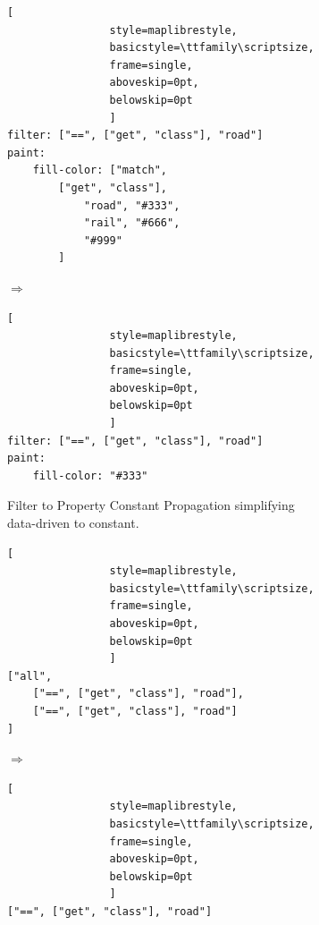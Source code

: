 \begin{figure}[ht]
\begin{subfigure}[t]{\linewidth}
		\begin{minipage}[c]{0.42\linewidth}
			\centering
			\begin{lstlisting}[
				style=maplibrestyle,
				basicstyle=\ttfamily\scriptsize,
				frame=single,
				aboveskip=0pt,
				belowskip=0pt
				]
filter: ["==", ["get", "class"], "road"]
paint:
	fill-color: ["match",
		["get", "class"],
			"road", "#333",
			"rail", "#666",
			"#999"
		]
			\end{lstlisting}
		\end{minipage}
		\hfill
		\begin{minipage}[c]{0.08\linewidth}
			\centering
			\vfill
			{\Huge$\Longrightarrow$}
			\vfill
		\end{minipage}
		\hfill
		\begin{minipage}[c]{0.42\linewidth}
			\centering
			\begin{lstlisting}[
				style=maplibrestyle,
				basicstyle=\ttfamily\scriptsize,
				frame=single,
				aboveskip=0pt,
				belowskip=0pt
				]
filter: ["==", ["get", "class"], "road"]
paint:
	fill-color: "#333"
			\end{lstlisting}
		\end{minipage}

		\caption{
Filter to Property Constant Propagation simplifying data-driven to constant.}
		\label{fig:expr_b}
	\end{subfigure}

	\vspace{4mm}

	\begin{subfigure}[t]{\linewidth}
		\centering

		\begin{minipage}[c]{0.42\linewidth}
			\centering
			\begin{lstlisting}[
				style=maplibrestyle,
				basicstyle=\ttfamily\scriptsize,
				frame=single,
				aboveskip=0pt,
				belowskip=0pt
				]
["all",
	["==", ["get", "class"], "road"],
	["==", ["get", "class"], "road"]
]
			\end{lstlisting}
		\end{minipage}
		\hfill
		\begin{minipage}[c]{0.08\linewidth}
			\centering
			\vfill
			{\Huge$\Longrightarrow$}
			\vfill
		\end{minipage}
		\hfill
		\begin{minipage}[c]{0.42\linewidth}
			\centering
			\begin{lstlisting}[
				style=maplibrestyle,
				basicstyle=\ttfamily\scriptsize,
				frame=single,
				aboveskip=0pt,
				belowskip=0pt
				]
["==", ["get", "class"], "road"]
			\end{lstlisting}
		\end{minipage}


\end{subfigure}
\end{figure}

